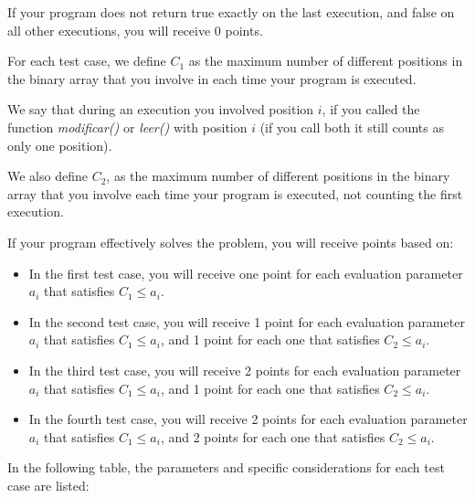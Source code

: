 \documentclass[12pt]{scrartcl}
\begin{document}
        If your program does not return true exactly on the last execution, and false on all other executions, you will receive 0 points.

        For each test case, we define $C_1$ as the maximum number of different positions in the binary array that you involve in each time your program is executed. 
        
        We say that during an execution you involved position $i$, if you called the function {\itshape modificar()} or {\itshape leer()} with position $i$ (if you call both it still counts as only one position). 
        
        We also define $C_2$, as the maximum number of different positions in the binary array that you involve each time your program is executed, not counting the first execution.
        
        If your program effectively solves the problem, you will receive points based on:
        
        
        \begin{itemize}
            \item In the first test case, you will receive one point for each evaluation parameter $a_i$ that satisfies $C_1 \le a_i$.
            \item In the second test case, you will receive 1 point for each evaluation parameter $a_i$ that satisfies $C_1 \le a_i$, and 1 point for each one that satisfies $C_2 \le a_i$.
            \item In the third test case, you will receive 2 points for each evaluation parameter $a_i$ that satisfies $C_1 \le a_i$, and 1 point for each one that satisfies $C_2 \le a_i$.
            \item In the fourth test case, you will receive 2 points for each evaluation parameter $a_i$ that satisfies $C_1 \le a_i$, and 2 points for each one that satisfies $C_2 \le a_i$.
            
        \end{itemize}


        In the following table, the parameters and specific considerations for each test case are listed:
        
        \null
        
\end{document}
